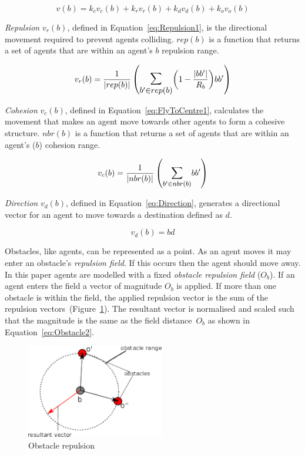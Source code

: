\documentclass{ieeeaccess}
\begin{document}
\begin{equation}\label{eq:BotPhysics1}
  v(b) = k_cv_c(b) + k_rv_r(b) + k_dv_d(b) + k_ov_o(b)
\end{equation}

\textit{Repulsion} $v_{r}(b)$, defined in Equation~\ref{eq:Repulsion1}, is the directional movement required to prevent agents colliding. $rep(b)$ is a function that returns a set of agents that are within an agent's $b$ repulsion range.

\begin{equation}\label{eq:Repulsion1}
v_{r}(b) = 
\frac{1}{|rep(b)|}
\left(
\mathlarger{\mathlarger{\sum_{b' \in rep(b)}}}
{\left( 1-\frac{|bb'|}{R_b} \right)}
{bb'}
\right)
\end{equation}

\textit{Cohesion} $v_{c}(b)$, defined in Equation~\ref{eq:FlyToCentre1}, calculates the movement that makes an agent move towards other agents to form a cohesive structure. $nbr(b)$ is a function that returns a set of agents that are within an agent's ($b$) cohesion range.

\begin{equation}\label{eq:FlyToCentre1}
v_{c}(b) = \frac{1}{|nbr(b)|}\left({\mathlarger{\sum_{b' \in nbr(b)}}{bb'}}\right)
\end{equation}

\textit{Direction} $v_d(b)$, defined in Equation~\ref{eq:Direction}, generates a directional vector for an agent to move towards a destination defined as $d$.

\begin{equation}
\label{eq:Direction}
v_d(b) = bd
\end{equation}

Obstacles, like agents, can be represented as a point. As an agent moves it may enter an obstacle's \textit{repulsion field}. If this occurs then the agent should move away. In this paper agents are modelled with a fixed \textit{obstacle repulsion field} ($O_b$). If an agent enters the field a vector of magnitude $O_b$ is applied. If more than one obstacle is within the field, the applied repulsion vector is the sum of the repulsion vectors~(Figure~\ref{fig:Obstacle1}). The resultant vector is normalised and scaled such that the magnitude is the same as the field distance~$O_b$ as shown in Equation~\ref{eq:Obstacle2}.

\begin{figure}[H]
\begin{center}
\includegraphics[width=6cm]{figures/Obstacle1}
\end{center}
\caption{Obstacle repulsion \label{fig:Obstacle1}}
\end{figure}
\end{document}
